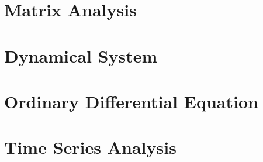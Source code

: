 \documentclass{article}
\begin{document}
\section{Matrix Analysis}


\section{Dynamical System}


\section{Ordinary Differential Equation}



\section{Time Series Analysis}





\end{document}
